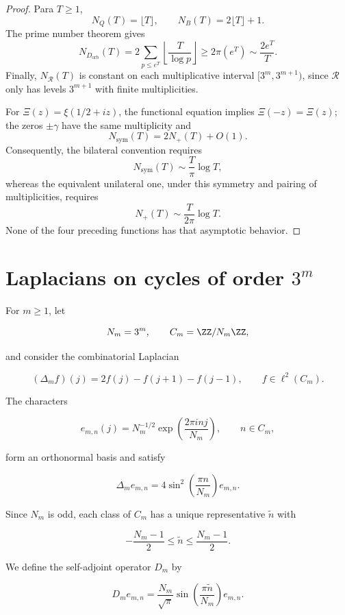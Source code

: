 \begin{proof}
Para \(T\ge1\),
\[
 N_Q(T)=\lfloor T\rfloor,
 \qquad
 N_B(T)=2\lfloor T\rfloor+1.
\]
The prime number theorem gives
\[
 N_{D_{\mathrm{orb}}}(T)
 =2\sum_{p\le e^T}\left\lfloor\frac{T}{\log p}\right\rfloor
 \ge2\pi(e^T)\sim\frac{2e^T}{T}.
\]
Finally, \(N_{\mathcal R}(T)\) is constant on each multiplicative
interval \([3^m,3^{m+1})\), since \(\mathcal R\) only has levels
\(3^{m+1}\) with finite multiplicities.

For
\(\Xi(z)=\xi(1/2+iz)\), the functional equation implies
\(\Xi(-z)=\Xi(z)\); the zeros \(\pm\gamma\) have the same multiplicity and
\[
 N_{\mathrm{sym}}(T)=2N_+(T)+O(1).
\]
Consequently, the bilateral convention requires
\[
 N_{\mathrm{sym}}(T)\sim\frac{T}{\pi}\log T,
\]
whereas the equivalent unilateral one, under this symmetry and pairing of
multiplicities, requires
\[
 N_+(T)\sim\frac{T}{2\pi}\log T.
\]
None of the four preceding functions has that asymptotic behavior.
\end{proof}

\section{Laplacians on cycles of order \texorpdfstring{$3^m$}{powers of three}}

For $m\geq 1$, let

\[
 N_m=3^m,
 \qquad
 C_m=\ZZ/N_m\ZZ,
\]

and consider the combinatorial Laplacian

\[
 (\Delta_m f)(j)=2f(j)-f(j+1)-f(j-1),
 \qquad f\in\ell^2(C_m).
\]

The characters

\[
 e_{m,n}(j)=N_m^{-1/2}
 \exp\!\left(\frac{2\pi i n j}{N_m}\right),
 \qquad n\in C_m,
\]

form an orthonormal basis and satisfy

\[
 \Delta_m e_{m,n}
 =4\sin^2\!\left(\frac{\pi n}{N_m}\right)e_{m,n}.
\]

Since $N_m$ is odd, each class of $C_m$ has a unique representative
$\widetilde n$ with

\[
 -\frac{N_m-1}{2}\leq\widetilde n\leq\frac{N_m-1}{2}.
\]

We define the self-adjoint operator $D_m$ by

\begin{equation}
 D_m e_{m,n}
 =\frac{N_m}{\sqrt\pi}
 \sin\!\left(\frac{\pi\widetilde n}{N_m}\right)e_{m,n}.
 \label{eq:operador-espectral-Dm}
\end{equation}

